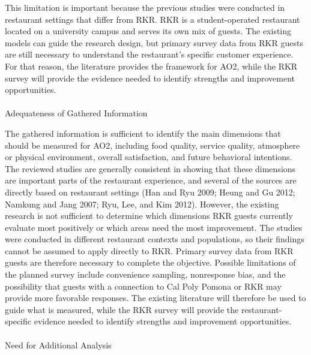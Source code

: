 \documentclass[
  12pt,
  letterpaper,
  DIV=11,
  numbers=noendperiod]{scrartcl}
\makeatletter
\let\oldparagraph\paragraph
\renewcommand{\paragraph}{
    \@ifstar
      \xxxParagraphStar
      \xxxParagraphNoStar
  }
\newcommand{\xxxParagraphStar}[1]{\oldparagraph*{#1}\mbox{}}
\newcommand{\xxxParagraphNoStar}[1]{\oldparagraph{#1}\mbox{}}
\makeatother
\begin{document}
This limitation is important because the previous studies were conducted
in restaurant settings that differ from RKR. RKR is a student-operated
restaurant located on a university campus and serves its own mix of
guests. The existing models can guide the research design, but primary
survey data from RKR guests are still necessary to understand the
restaurant's specific customer experience. For that reason, the
literature provides the framework for AO2, while the RKR survey will
provide the evidence needed to identify strengths and improvement
opportunities.

\paragraph{Adequateness of Gathered
Information}\label{adequateness-of-gathered-information-1}

The gathered information is sufficient to identify the main dimensions
that should be measured for AO2, including food quality, service
quality, atmosphere or physical environment, overall satisfaction, and
future behavioral intentions. The reviewed studies are generally
consistent in showing that these dimensions are important parts of the
restaurant experience, and several of the sources are directly based on
restaurant settings (Han and Ryu 2009; Heung and Gu 2012; Namkung and
Jang 2007; Ryu, Lee, and Kim 2012). However, the existing research is
not sufficient to determine which dimensions RKR guests currently
evaluate most positively or which areas need the most improvement. The
studies were conducted in different restaurant contexts and populations,
so their findings cannot be assumed to apply directly to RKR. Primary
survey data from RKR guests are therefore necessary to complete the
objective. Possible limitations of the planned survey include
convenience sampling, nonresponse bias, and the possibility that guests
with a connection to Cal Poly Pomona or RKR may provide more favorable
responses. The existing literature will therefore be used to guide what
is measured, while the RKR survey will provide the restaurant-specific
evidence needed to identify strengths and improvement opportunities.

\paragraph{Need for Additional
Analysis}\label{need-for-additional-analysis-1}
\end{document}
